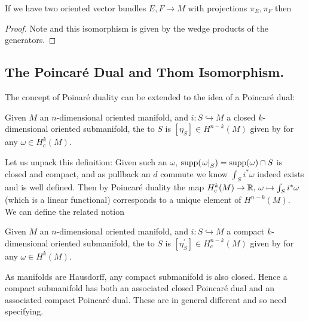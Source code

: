 \documentclass{article}
\begin{document}
\begin{prop}
	If we have two oriented vector bundles $E,F \to M$ with projections $\pi_E, \pi_F$ then 
\end{prop}
\begin{proof}
	Note 
	and this isomorphism is given by the wedge products of the generators. 
\end{proof}


\subsection{The Poincar\'e Dual and Thom Isomorphism. }
The concept of Poinar\'e duality can be extended to the idea of a Poincar\'e dual:

\begin{definition}
	Given $M$ an $n$-dimensional oriented manifold, and $i:S \hookrightarrow M$ a closed $k$-dimensional oriented submanifold, the  to $S$ is $[\eta_S]\in H^{n-k}(M)$ given by 
	for any $\omega \in H_c^k(M)$. 
\end{definition}

Let us unpack this definition: Given such an $\omega$, $\operatorname{supp}(\left. \omega \right\rvert_{S}) = \operatorname{supp}(\omega) \cap S$ is closed and compact, and as pullback an $d$ commute we know $\int_S i^\ast \omega$ indeed exists and is well defined. Then by Poincar\'e duality the map $H_c^k(M) \to \mathbb{R}, \, \omega \mapsto \int_S i^\ast \omega$ (which is a linear functional) corresponds to a unique element of $H^{n-k}(M)$. \\
We can define the related notion 
\begin{definition}
	Given $M$ an $n$-dimensional oriented manifold, and $i:S \hookrightarrow M$ a compact $k$-dimensional oriented submanifold, the  to $S$ is $[\eta_S^\prime]\in H^{n-k}_c(M)$ given by 
	for any $\omega \in H^k(M)$. 	
\end{definition}

\begin{remark}
	As manifolds are Hausdorff, any compact submanifold is also closed. Hence a compact submanifold has both an associated closed Poincar\'e dual and an associated compact Poincar\'e dual. These are in general different and so need specifying. 
\end{remark}
\end{document}
